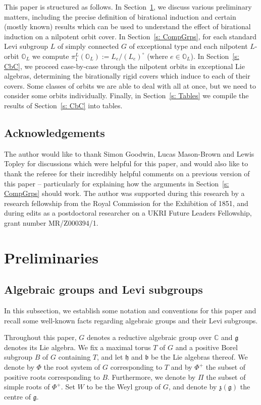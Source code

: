 \documentclass[11pt]{amsart}
\newcommand{\C}{{\mathbb C}}
\renewcommand{\O}{{\mathbb O}}
\renewcommand{\b}{{\mathfrak b}}
\newcommand{\g}{{\mathfrak g}}
\newcommand{\h}{{\mathfrak h}}
\newcommand{\z}{{\mathfrak z}}
\newcommand{\zg}{\z(\g)}
\numberwithin{equation}{section}
\begin{document}
	This paper is structured as follows. In Section~\ref{s: Prelim}, we discuss various preliminary matters, including the precise definition of birational induction and certain (mostly known) results which can be used to understand the effect of birational induction on a nilpotent orbit cover. In Section~\ref{s: CompGrps}, for each standard Levi subgroup $L$ of simply connected $G$ of exceptional type and each nilpotent $L$-orbit $\O_L$ we compute $\pi_1^L(\O_L):=L_e/(L_e)^\circ$ (where $e\in\O_L$). In Section~\ref{s: CbC}, we proceed case-by-case through the nilpotent orbits in exceptional Lie algebras, determining the birationally rigid covers which induce to each of their covers. Some classes of orbits we are able to deal with all at once, but we need to consider some orbits individually. Finally, in Section~\ref{s: Tables} we compile the results of Section~\ref{s: CbC} into tables.
	
	\subsection*{Acknowledgements}
	The author would like to thank Simon Goodwin, Lucas Mason-Brown and Lewis Topley for discussions which were helpful for this paper, and would also like to thank the referee for their incredibly helpful comments on a previous version of this paper -- particularly for explaining how the arguments in Section~\ref{s: CompGrps} should work. The author was supported during this research by a research fellowship from the Royal Commission for the Exhibition of 1851, and during edits as a postdoctoral researcher on a UKRI Future Leaders Fellowship, grant number MR/Z000394/1.
	
	
	\section{Preliminaries}\label{s: Prelim}
	
	\subsection{Algebraic groups and Levi subgroups}\label{ss: AlgGps}
	
	In this subsection, we establish some notation and conventions for this paper and recall some well-known facts regarding algebraic groups and their Levi subgroups. 
	
	Throughout this paper, $G$ denotes a reductive algebraic group over $\C$ and $\g$ denotes its Lie algebra. We fix a maximal torus $T$ of $G$ and a positive Borel subgroup $B$ of $G$ containing $T$, and let $\h$ and $\b$ be the Lie algebras thereof. We denote by $\Phi$ the root system of $G$ corresponding to $T$ and by $\Phi^{+}$ the subset of positive roots corresponding to $B$. Furthermore, we denote by $\Pi$ the subset of simple roots of $\Phi^{+}$. Set $W$ to be the Weyl group of $G$, and denote by $\zg$ the centre of $\g$.
	
\end{document}
